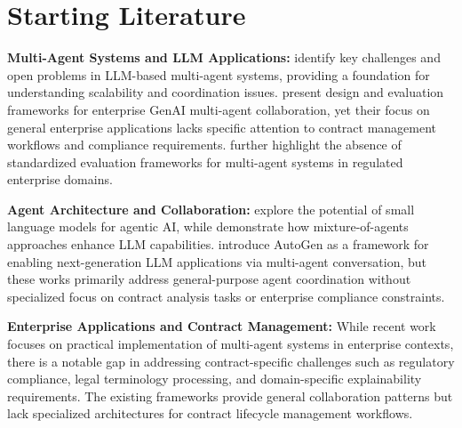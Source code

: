 
\section{Starting Literature}\label{section:starting_literature}

\textbf{Multi-Agent Systems and LLM Applications:} \cite{han2025llmmultiagentsystemschallenges} identify key challenges and open problems in LLM-based multi-agent systems, providing a foundation for understanding scalability and coordination issues. \cite{shu2024effectivegenaimultiagentcollaboration} present design and evaluation frameworks for enterprise GenAI multi-agent collaboration, yet their focus on general enterprise applications lacks specific attention to contract management workflows and compliance requirements. \cite{yehudai2025llmagentevaluationregulated} further highlight the absence of standardized evaluation frameworks for multi-agent systems in regulated enterprise domains.

\textbf{Agent Architecture and Collaboration:} \cite{belcak2025smalllanguagemodelsfuture} explore the potential of small language models for agentic AI, while \cite{wang2024mixtureofagentsenhanceslargelanguage} demonstrate how mixture-of-agents approaches enhance LLM capabilities. \cite{wu2023autogenenablingnextgenllm} introduce AutoGen as a framework for enabling next-generation LLM applications via multi-agent conversation, but these works primarily address general-purpose agent coordination without specialized focus on contract analysis tasks or enterprise compliance constraints.

\textbf{Enterprise Applications and Contract Management:} While recent work focuses on practical implementation of multi-agent systems in enterprise contexts, there is a notable gap in addressing contract-specific challenges such as regulatory compliance, legal terminology processing, and domain-specific explainability requirements. The existing frameworks provide general collaboration patterns but lack specialized architectures for contract lifecycle management workflows.

